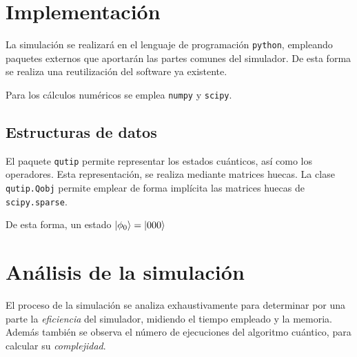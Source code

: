 

\setcounter{section}{4}
\usetikzlibrary{shapes,arrows,chains}
\usetikzlibrary{decorations.markings}



\section{Implementación}
La simulación se realizará en el lenguaje de programación \texttt{python}, 
empleando paquetes externos que aportarán las partes comunes del simulador. De 
esta forma se realiza una reutilización del software ya existente.

Para los cálculos numéricos se emplea \texttt{numpy} y \texttt{scipy}.

\subsection{Estructuras de datos}
El paquete \texttt{qutip} permite representar los estados cuánticos, así como 
los operadores. Esta representación, se realiza mediante matrices huecas. La 
clase \texttt{qutip.Qobj} permite emplear de forma implícita las matrices huecas 
de \texttt{scipy.sparse}.

De esta forma, un estado $\ket{\phi_0} = \ket{000} $


\section{Análisis de la simulación}

El proceso de la simulación se analiza exhaustivamente para determinar por una 
parte la \textit{eficiencia} del simulador, midiendo el tiempo empleado y la 
memoria. Además también se observa el número de ejecuciones del algoritmo 
cuántico, para calcular su \textit{complejidad}.

